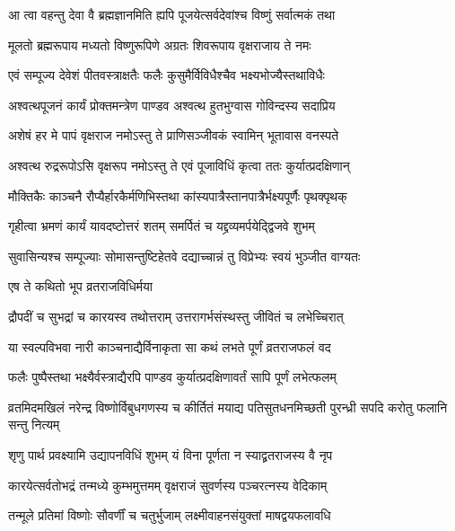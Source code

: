 \twolineshloka
{आ त्वा वहन्तु देवा वै ब्रह्मज्ञानमिति ह्यपि}
{पूजयेत्सर्वदेवांश्च विष्णुं सर्वात्मकं तथा} %

\twolineshloka
{मूलतो ब्रह्मरूपाय मध्यतो विष्णुरूपिणे}
{अग्रतः शिवरूपाय वृक्षराजाय ते नमः} %

\twolineshloka
{एवं सम्पूज्य देवेशं पीतवस्त्राक्षतैः फलैः}
{कुसुमैर्विविधैश्चैव भक्ष्यभोज्यैस्तथाविधैः} %

\twolineshloka
{अश्वत्थपूजनं कार्यं प्रोक्तमन्त्रेण पाण्डव}
{अश्वत्थ हुतभुग्वास गोविन्दस्य सदाप्रिय} %

\twolineshloka
{अशेषं हर मे पापं वृक्षराज नमोऽस्तु ते}
{प्राणिसञ्जीवकं स्वामिन् भूतावास वनस्पते} %

\twolineshloka
{अश्वत्थ रुद्ररूपोऽसि वृक्षरूप नमोऽस्तु ते}
{एवं पूजाविधिं कृत्वा ततः कुर्यात्प्रदक्षिणान्} %

\twolineshloka
{मौक्तिकैः काञ्चनै रौप्यैर्हारकैर्मणिभिस्तथा}
{कांस्यपात्रैस्तानपात्रैर्भक्ष्यपूर्णैः पृथक्पृथक्} %

\twolineshloka
{गृहीत्वा भ्रमणं कार्यं यावदष्टोत्तरं शतम्}
{समर्पितं च यद्द्रव्यमर्पयेद्द्विजवे शुभम्} %

\twolineshloka
{सुवासिन्यश्च सम्पूज्याः सोमासन्तुष्टिहेतवे}
{दद्याच्चान्नं तु विप्रेभ्यः स्वयं भुञ्जीत वाग्यतः} %

\onelineshloka
{एष ते कथितो भूप व्रतराजविधिर्मया} %

\twolineshloka
{द्रौपदीं च सुभद्रां च कारयस्व तथोत्तराम्}
{उत्तरागर्भसंस्थस्तु जीवितं च लभेच्चिरात्} %


\twolineshloka
{या स्वल्पविभवा नारी काञ्चनाद्यैर्विनाकृता}
{सा कथं लभते पूर्णं व्रतराजफलं वद} %


\twolineshloka
{फलैः पुष्पैस्तथा भक्ष्यैर्वस्त्राद्यैरपि पाण्डव}
{कुर्यात्प्रदक्षिणावर्तं सापि पूर्णं लभेत्फलम्} %

\twolineshloka
{व्रतमिदमखिलं नरेन्द्र विष्णोर्विबुधगणस्य च कीर्तितं मयाद्य}
{पतिसुतधनमिच्छती पुरन्ध्री सपदि करोतु फलानि सन्तु नित्यम्} %


\twolineshloka
{शृणु पार्थ प्रवक्ष्यामि उद्यापनविधिं शुभम्}
{यं विना पूर्णता न स्याद्व्रतराजस्य वै नृप} %

\twolineshloka
{कारयेत्सर्वतोभद्रं तन्मध्ये कुम्भमुत्तमम्}
{वृक्षराजं सुवर्णस्य पञ्चरत्नस्य वेदिकाम्} %

\twolineshloka
{तन्मूले प्रतिमां विष्णोः सौवर्णीं च चतुर्भुजाम्}
{लक्ष्मीवाहनसंयुक्तां माषद्वयफलावधि} %

